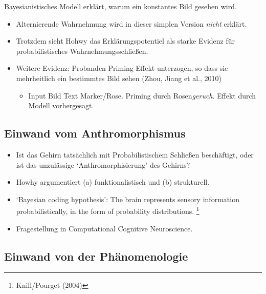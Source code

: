 \documentclass[11pt, handout]{beamer}
\begin{document}
\begin{frame}
  Bayesianistisches Modell erklärt, warum ein konstantes Bild gesehen
  wird.

  \begin{itemize}[<+->]
  \item Alternierende Wahrnehmung wird in dieser simplen Version
    \emph{nicht} erklärt.
  \item Trotzdem sieht Hohwy das Erklärungspotentiel als starke
    Evidenz für probabilistisches Wahrnehmungsschließen.
  \item Weitere Evidenz: Probanden Priming-Effekt unterzogen, so dass
    sie mehrheitlich ein bestimmtes Bild sehen (Zhou, Jiang et al.,
    2010)
    \begin{itemize}[<+->]
    \item Input Bild Text Marker/Rose. Priming durch
      Rosen\emph{geruch}. Effekt durch Modell vorhergesagt.
    \end{itemize}
  \end{itemize}
\end{frame}



\subsection{Einwand vom Anthromorphismus}

\begin{frame}
  \begin{itemize}[<+->]
  \item Ist das Gehirn tatsächlich mit Probabilistischem Schließen
    beschäftigt, oder ist das unzulässige `Anthromorphisierung' des
    Gehirns?
  \item Howhy argumentiert (a) funktionalistisch und (b) strukturell.
  \item `Bayesian coding hypothesis': The brain represents sensory
    information probabilistically, in the form of probability
    distributions. \footnote{Knill/Pourget (2004)}
  \item Fragestellung in Computational Cognitive Neuroscience.
  \end{itemize}
\end{frame}

\subsection{Einwand von der Phänomenologie}
\end{document}
